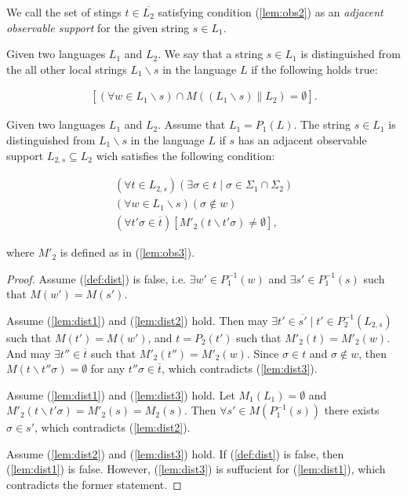 \documentclass[a4paper, 10pt, conference]{ieeeconf}
\begin{document}
We call the set of stings $t \in \overline{L_2}$ satisfying condition
(\ref{lem:obs2}) as an \emph{adjacent observable support} for the given string
$s \in L_1$.

\begin{definition} Given two languages $L_1$ and $L_2$. We say that a string $s
\in L_{1}$ is distinguished from the all other local strings $L_1\backslash s$
in the language $L$ if the following holds true:
\end{definition}
\begin{equation}
\label{def:dist}
\begin{array}{l}
	\left[
		(\forall w \in L_1\backslash s) \cap M((L_1\backslash s) \parallel L_2) 
		= \emptyset
	\right].
\end{array}
\end{equation}

\begin{lemma}
\label{lem:distinguished}
Given two languages $L_1$ and $L_2$. Assume that $L_1 = P_1(L)$. The string $s
\in L_1$ is distinguished from $L_1\backslash s$ in the language $L$ if $s$ has
an adjacent observable support $L_{2,s} \subseteq L_2$ wich satisfies the
following condition:
\end{lemma}
\begin{subequations}
\begin{align}
	(\forall t \in L_{2,s})
	(\exists \sigma \in t \mid \sigma \in \Sigma_1 \cap \Sigma_2)
	\label{lem:dist1}
	\\
	(\forall w \in L_1\backslash s)(\sigma \not \in w)
	\label{lem:dist2}
	\\
	(\forall t'\sigma \in \overline{t})
	[M'_2(t\backslash t'\sigma) \neq \emptyset]
	\label{lem:dist3},
\end{align}
\end{subequations}

where $M'_2$ is defined as in (\ref{lem:obs3}). 

\begin{proof}
Assume (\ref{def:dist}) is false, i.e. $\exists w' \in P_1^{-1}(w)$ and $\exists
s' \in P_1^{-1}(s)$ such that $M(w') = M(s')$. 

Assume (\ref{lem:dist1}) and (\ref{lem:dist2}) hold. Then may $\exists t' \in
\overline{s'} \mid t' \in P_2^{-1}(L_{2,s})$ such that $M(t') = M(w')$, and $t =
P_2(t')$ such that $M'_2(t) = M'_2(w)$. And may $\exists t'' \in \overline{t}$
such that $M'_2(t'') = M'_2(w)$. Since $\sigma \in t$ and $\sigma \not \in w$,
then $M(t \backslash t''\sigma) = \emptyset$ for any $t''\sigma \in
\overline{t}$, which contradicts (\ref{lem:dist3}).

Assume (\ref{lem:dist1}) and (\ref{lem:dist3}) hold. Let $M_1(L_1) = \emptyset$
and $M'_2(t\backslash t'\sigma) = M'_2(s) = M_2(s)$. Then $\forall s' \in
M(P_1^{-1}(s))$ there exists $\sigma \in s'$, which contradicts
(\ref{lem:dist2}).

Assume (\ref{lem:dist2}) and (\ref{lem:dist3}) hold. If (\ref{def:dist}) is
false, then (\ref{lem:dist1}) is false. However, (\ref{lem:dist3}) is suffucient
for (\ref{lem:dist1}), which contradicts the former statement.
\end{proof}
\end{document}
